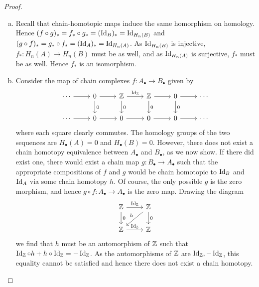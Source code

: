 \documentclass{../../mathnotes}
\begin{document}
\begin{proof}\hfill
    \begin{enumerate}[(a)]
        \item Recall that chain-homotopic maps induce the same homorphism on homology. Hence $(f\circ g)_*=f_*\circ g_*=(\operatorname{Id}_B)_*=\operatorname{Id}_{H_n(B)}$
            and $(g\circ f)_*=g_*\circ f_*=(\operatorname{Id}_A)_*=\operatorname{Id}_{H_n(A)}$. As $\operatorname{Id}_{H_n(B)}$ is injective, $f_*:H_n(A)\to H_n(B)$ must be as well, and 
            as $\operatorname{Id}_{H_n(A)}$ is surjective, $f_*$ must be as well. Hence $f_*$ is an isomorphism.
        \item Consider the map of chain complexes $f:A_\bullet\to B_\bullet$ given by
            \begin{equation*}
                \begin{tikzcd}
                    \cdots\ar{r}&0\ar{r}\ar{d}{0}&\Z\ar{r}{\id_\Z}\ar{d}{0}&\Z\ar{r}\ar{d}{0}&0\ar{r}\ar{d}{0}&\cdots\\
                    \cdots\ar{r}&0\ar{r}&0\ar{r}&0\ar{r}&0\ar{r}&\cdots
                \end{tikzcd}
            \end{equation*}
            where each square clearly commutes. The homology groups of the two sequences are $H_\bullet(A)=0$ and $H_\bullet(B)=0$.
            However, there does not exist a chain homotopy equivalence between $A_\bullet$ and $B_\bullet$, as we now show.
            If there did exist one, there would exist a chain map $g:B_\bullet\to A_\bullet$ such that the appropriate compositions
            of $f$ and $g$ would be chain homotopic to $\operatorname{Id}_B$ and $\operatorname{Id}_A$ via some chain homotopy $h$. Of course, the only possible $g$
            is the zero morphism, and hence $g\circ f:A_\bullet\to A_\bullet$ is the zero map. Drawing the diagram
            \begin{equation*}
                \begin{tikzcd}
                    \Z\ar{r}{\id_\Z}\ar{d}{0}&\Z\ar{d}{0}\ar[swap]{dl}{h}\\
                    \Z\ar{r}{\id_\Z}&\Z
                \end{tikzcd}
            \end{equation*}
            we find that $h$ must be an automorphism of $\mathbb{Z}$ such that $\operatorname{Id}_{\mathbb{Z}}\circ h+h\circ\operatorname{Id}_{\mathbb{Z}}=-\operatorname{Id}_{\mathbb{Z}}$.
            As the automorphisms of $\mathbb{Z}$ are $\operatorname{Id}_{\mathbb{Z}},-\operatorname{Id}_{\mathbb{Z}}$, this equality cannot be satisfied and hence there does not exist
            a chain homotopy.
    \end{enumerate}
\end{proof}
\end{document}
